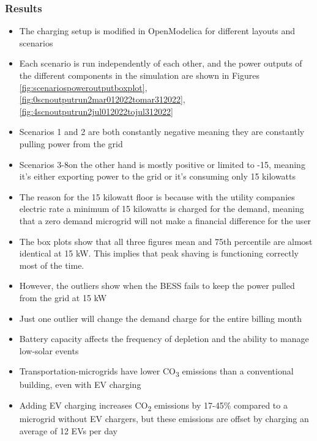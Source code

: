\documentclass[aspectratio=169, 8 pt]{beamer}
\begin{document}
		\begin{frame}
			\frametitle{Results}
			\begin{itemize}
				\item The charging setup is modified in OpenModelica for different layouts and scenarios
				\item Each scenario is run independently of each other, and the power outputs of the different components in the simulation are shown in Figures \ref{fig:scenariospoweroutputboxplot}, \ref{fig:0scnoutputrun2mar012022tomar312022}, \ref{fig:4scnoutputrun2jul012022tojul312022}
				\item Scenarios 1 and 2 are both constantly negative meaning they are constantly pulling power from the grid
				\item Scenarios 3-8on the other hand is mostly positive or limited to -15, meaning it's either exporting power to the grid or it's consuming only 15 kilowatts
				\item The reason for the 15 kilowatt floor is because with the utility companies electric rate a minimum of 15 kilowatts is charged for the demand, meaning that a zero demand microgrid will not make a financial difference for the user
				\item The box plots show that all three figures mean and 75th percentile are almost identical at 15 kW. This implies that peak shaving is functioning correctly most of the time.
				\item However, the outliers show when the BESS fails to keep the power pulled from the grid at 15 kW
				\item Just one outlier will change the demand charge for the entire billing month
				\item Battery capacity affects the frequency of depletion and the ability to manage low-solar events
				\item Transportation-microgrids have lower CO\textsubscript{3} emissions than a conventional building, even with EV charging
				\item Adding EV charging increases CO\textsubscript{2} emissions by 17-45\% compared to a microgrid without EV chargers, but these emissions are offset by charging an average of 12 EVs per day
			\end{itemize}
			
		\end{frame}
		
\end{document}
